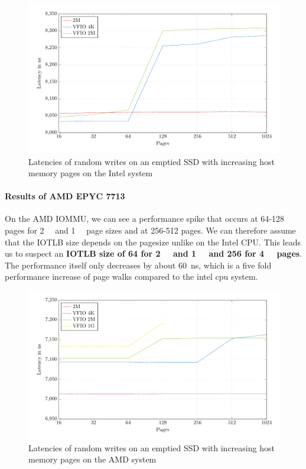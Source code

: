 \begin{figure}[H]
  \centering
  \includegraphics[width=\textwidth]{figures/psmeds}
  \caption{Latencies of random writes on an emptied SSD with increasing host memory pages on the Intel system}
  \label{fig:med-ps}
\end{figure}

\paragraph{Results of AMD EPYC 7713}
On the AMD IOMMU, we can see a performance spike that occurs at 64-128 pages for \qty{2}{\mebi\byte} and \qty{1}{\gibi\byte} page sizes and at 256-512 pages. We can therefore assume that the IOTLB size depends on the pagesize unlike on the Intel CPU. This leads us to suspect an \textbf{IOTLB size of 64 for \qty{2}{\mebi\byte} and \qty{1}{\gibi\byte} and 256 for \qty{4}{\kibi\byte} pages}. The performance itself only decreases by about \qty{60}{ns}, which is a five fold performance increase of page walks compared to the intel cpu system.

\begin{figure}[H]
  \centering
  \includegraphics[width=\textwidth]{figures/psmedsepyc}
  \caption{Latencies of random writes on an emptied SSD with increasing host memory pages on the AMD system}
  \label{fig:med-psepyc}
\end{figure}

